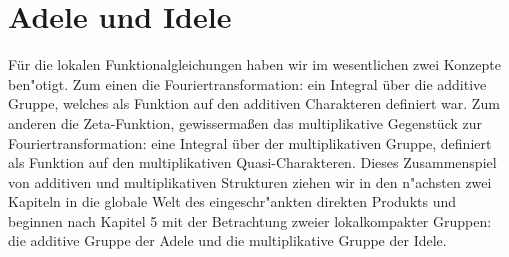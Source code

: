 \section{Adele und Idele}\label{sec:adeleidele} 
	Für die lokalen Funktionalgleichungen haben wir im wesentlichen zwei Konzepte ben"otigt.
	Zum einen die Fouriertransformation: ein Integral über die additive Gruppe, welches als Funktion auf den additiven Charakteren definiert war.
	Zum anderen die Zeta-Funktion, gewissermaßen das multiplikative Gegenstück zur Fouriertransformation: eine Integral über der multiplikativen Gruppe, definiert als
	Funktion auf den multiplikativen Quasi-Charakteren.
	Dieses Zusammenspiel von additiven und multiplikativen Strukturen ziehen wir in den n"achsten zwei Kapiteln in die globale Welt des eingeschr"ankten direkten Produkts und beginnen nach \textcite{deitmar2010} Kapitel 5 mit der Betrachtung zweier lokalkompakter Gruppen: die additive Gruppe der Adele und die multiplikative Gruppe der Idele.
